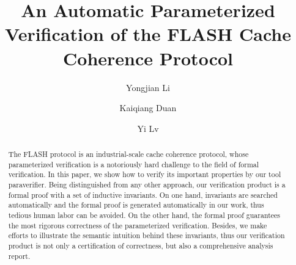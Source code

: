 \documentclass{llncs-new}
\newcommand{\bedt}[1]{{\color{black}#1}}
\begin{document}
\title{  An Automatic Parameterized Verification of the FLASH Cache Coherence Protocol}
\author{Yongjian Li  \and
        Kaiqiang Duan  \and
        Yi Lv  }

\maketitle
\begin{abstract}
The FLASH protocol is an industrial-scale cache coherence protocol, whose parameterized verification is a notoriously hard challenge to the field of formal \bedt{verification}. In this paper, we show how to verify its important properties by our tool {\sf paraverifier}. Being distinguished from any other approach, our verification product is a formal  proof with a set of inductive invariants. %
\bedt{On one hand, invariants are searched automatically and the formal proof is generated automatically in our work, thus tedious human labor can be avoided. On the other hand, the formal proof guarantees the most rigorous correctness of the parameterized verification. Besides, we make efforts to illustrate the semantic intuition behind these invariants, thus our verification product is not only a certification of correctness, but also a comprehensive analysis report.}

\end{abstract}
\vspace{-10pt}
\end{document}
